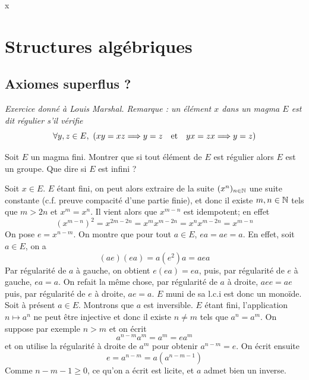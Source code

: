x%


%
%

\section[Structures algébriques]{Structures algébriques}
\subsection{Axiomes superflus ?}
\textit{Exercice donné à Louis Marshal. Remarque : un élément $x$ dans un magma $E$ est dit régulier s'il vérifie} \[\forall y,z\in E,\ (xy=xz\Longrightarrow y=z\quad\text{et}\quad yx=zx\Longrightarrow y=z)\]
\begin{exo}
 	Soit $E$ un magma fini. Montrer que si tout élément de $E$ est régulier alors $E$ est un groupe. Que dire si $E$ est infini ?
\end{exo}

\begin{sol}
	Soit $x\in E$. $E$ étant fini, on peut alors extraire de la suite $(x^n)_{n\in\mathbb{N}}$ une suite constante (c.f. preuve compacité d'une partie finie), et donc il existe $m,n \in\mathbb{N}$ tels que $m>2n$ et $x^m=x^n$. Il vient alors que $x^{m-n}$ est idempotent; en effet \[(x^{m-n})^2=x^{2m-2n}=x^mx^{m-2n}=x^nx^{m-2n}=x^{m-n}\]
	On pose $e=x^{n-m}$. On montre que pour tout $a\in E$, $ea=ae=a$. En effet, soit $a\in E$, on a \[(ae)(ea)=a(e^2)a=aea\]
	Par régularité de $a$ à gauche, on obtient $e(ea)=ea$, puis, par régularité de $e$ à gauche, $ea=a$. On refait la même chose, par régularité de $a$ à droite, $aee=ae$ puis, par régularité de $e$ à droite, $ae=a$. $E$ muni de sa l.c.i est donc un monoïde.\\
	Soit à présent $a\in E$. Montrons que $a$ est inversible. $E$ étant fini, l'application $n\mapsto a^n$ ne peut être injective et donc il existe $n\neq m$ tels que $a^n=a^m$. On suppose par exemple $n>m$ et on écrit \[a^{n-m}a^m=a^m=ea^m\]
	et on utilise la régularité à droite de $a^m$ pour obtenir $a^{n-m}=e$. On écrit ensuite \[e=a^{n-m}=a(a^{n-m-1})\]
	Comme $n-m-1\geq 0$, ce qu'on a écrit est licite, et $a$ admet bien un inverse.
\end{sol}

